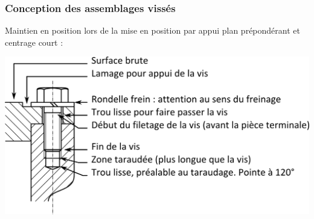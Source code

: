 \documentclass[11pt,oneside]{article}
\begin{document}
%
%
%
%
%
%
%
%

\subsubsection{Conception des assemblages vissés}
Maintien en position lors de la mise en position par appui plan prépondérant et centrage court :

\begin{center}
\includegraphics[width=.8\textwidth]{png/Fig30_1}
\end{center}
\end{document}
